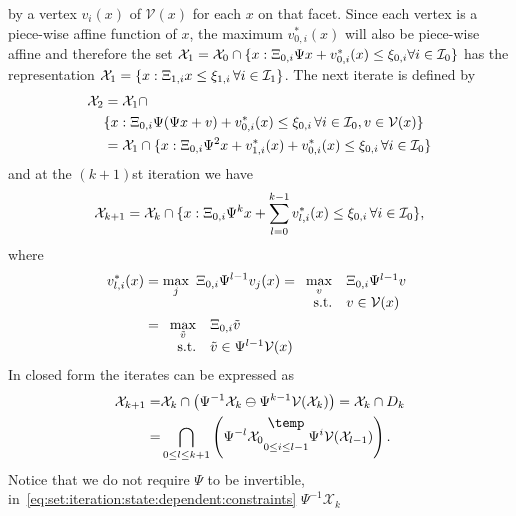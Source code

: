 \documentclass[letterpaper, 10pt, conference]{ieeeconf} %
\newcommand{\bigominus}{\raisebox{10pt}{$\temp$}}
\begin{document}
by a vertex $v_i(x)$ of $\mathcal V(x)$ for each $x$ on that facet.
Since each vertex is a piece-wise affine function of $x$, the maximum $v_{0,i}^\ast(x)$ will also
be piece-wise affine
and therefore the set $\mathcal X_1=\mathcal X_0 \cap \{x:\Xi_{0,i}\Psi x + v_{0,i}^\ast(x) \leq 
\xi_{0,i}\forall i\in\mathcal I_0\}$
has the representation $\mathcal X_1 = \{x:\Xi_{1,i}x\leq\xi_{1,i}\,\forall i\in\mathcal I_1\}$.
The next iterate is defined by
\begin{align*}
	\mathcal X_2 &= \mathcal X_1 \cap \\ &\{x:\Xi_{0,i}\Psi(\Psi x + v) + v_{0,i}^\ast(x)\leq\xi_{0,i}\,
	\forall i\in\mathcal I_0,v\in\mathcal V(x)\}\\
  &= \mathcal X_1 \cap \{x: \Xi_{0,i}\Psi^2 x + v_{1,i}^\ast(x) + v_{0,i}^\ast(x)\leq\xi_{0,i}\,\forall 
	i\in\mathcal I_0\}
\end{align*}
%
and at the $(k+1)$st iteration we have
%
\[
	\mathcal X_{k+1} = \mathcal X_k\cap \{x:\Xi_{0,i}\Psi^k x + \sum_{l=0}^{k-1}v_{l,i}^\ast(x)
	\leq\xi_{0,i}\,\forall i\in\mathcal I_0\},
\]
%
where 
%
\begin{align*}
	v_{l,i}^\ast(x)&=\max_j \ \genmat_{0,i}\Psi^{l-1}v_j(x)
	 = \begin{array}[t]{rl} \displaystyle\max_v & \genmat_{0,i}\Psi^{l-1}v \\ \text{s.t.}& v\in\mathcal V(x)
   \end{array} \\ 
   &= \begin{array}[t]{rl} \displaystyle\max_{\tilde v} & \genmat_{0,i}\tilde v\\ \text{s.t.}& \tilde v\in 
   \Psi^{l-1}\mathcal V(x) \end{array}
\end{align*}
%
In closed form the iterates can be expressed as
%
\begin{equation}\label{eq:set:iteration:state:dependent:constraints}
\begin{split}
	\mathcal X_{k+1} =& \mathcal X_k\cap\left(\Psi^{-1}\mathcal X_k \ominus \Psi^{k-1}\mathcal V(\mathcal X_k)\right)
	=\mathcal X_k\cap D_k \\
	=& \bigcap_{0\leq l\leq k+1}\left( \Psi^{-l} \mathcal X_0 \underset{0 \leq i\leq l-1}{\bigominus} 
  \Psi^i \mathcal V(\mathcal X_{l-1})\right).
\end{split}\end{equation}
%
Notice that we do not require $\Psi$ to be invertible, in~\eqref{eq:set:iteration:state:dependent:constraints} $\Psi^{-1}\mathcal X_k$
\end{document}
